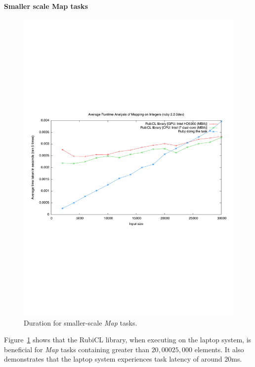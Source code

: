 \paragraph*{Smaller scale Map tasks}
\begin{figure}
  \includegraphics[trim=0cm 8cm 0cm 8cm, clip=true, width=\textwidth]{./graphing/smallmap.pdf}
  \caption{Duration for smaller-scale \emph{Map} tasks.}
  \label{fig:map_tasksmallrun}
\end{figure}

Figure~\ref{fig:map_tasksmallrun} shows that the RubiCL library, when executing on the laptop system, is beneficial for \emph{Map} tasks containing greater than $20,000$\textendash$25,000$ elements. It also demonstrates that the laptop system experiences task latency of around $20$ms.

